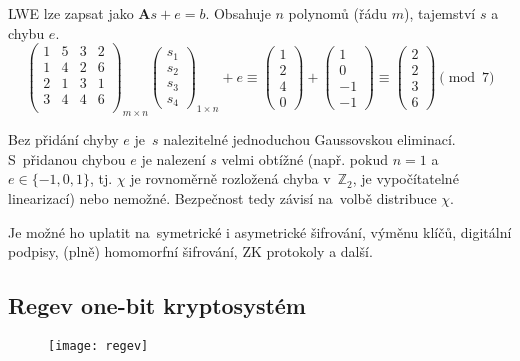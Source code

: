 LWE lze zapsat jako $\textbf{A}s + e = b$. Obsahuje $n$ polynomů (řádu $m$), tajemství $s$ a chybu $e$.
$$
\left(
\begin{matrix}
1 & 5 & 3 & 2 \\
1 & 4 & 2 & 6 \\
2 & 1 & 3 & 1 \\
3 & 4 & 4 & 6 \\
\end{matrix}
\right)_{m \times n}
\left(
\begin{matrix}
s_1 \\ s_2 \\ s_3 \\ s_4
\end{matrix}
\right)_{1 \times n} + e
\equiv \left(
\begin{matrix}
1 \\ 2 \\ 4 \\ 0
\end{matrix}
\right) + \left(
\begin{matrix}
1 \\ 0 \\ -1 \\ -1
\end{matrix}
\right)
\equiv \left(
\begin{matrix}
2 \\ 2 \\ 3 \\ 6
\end{matrix}
\right) \pmod 7
$$

Bez přidání chyby $e$ je~$s$ nalezitelné jednoduchou Gaussovskou eliminací.
S~přidanou chybou $e$ je nalezení $s$ velmi obtížné (např. pokud $n=1$ a $e \in \{-1, 0, 1\}$, tj. $\chi$ je rovnoměrně rozložená chyba v~$\mathbb{Z}_2$, je vypočítatelné linearizací) nebo nemožné.
Bezpečnost tedy závisí na~volbě distribuce $\chi$.

Je možné ho uplatit na~symetrické i asymetrické šifrování, výměnu klíčů, digitální podpisy, (plně) homomorfní šifrování, ZK protokoly a další.


\subsection{Regev one-bit kryptosystém}

\begin{figure}[ht]
    \centering
    \texttt{[image: regev]}
\end{figure}

